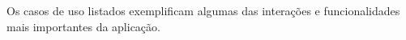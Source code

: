 Os casos de uso listados exemplificam algumas das interações e funcionalidades mais importantes da aplicação.

\begin{comment}
    \begin{table}[h]
        \centering
        \caption{Casos de Uso}
        \label{tab:tabela_casos_de_uso}
        \resizebox{\textwidth}{!}{%
        \rowcolors{1}{}{lightlightgray}
        \begin{tabular}{cccc}
        \hline
        \textbf{ID} & \textbf{Nome} & \textbf{Ator} & \textbf{Descrição} \\ \hline
        \textbf{UC01} & Efetuar login & \begin{tabular}[c]{@{}c@{}}Aluno, Coordenador\\ ou Professor\end{tabular} & \begin{tabular}[c]{@{}c@{}}Autenticação de usuários cadastrados no sistema,\\ permitindo a realização de operações restritas à cada perfil\end{tabular} \\
        \textbf{UC02} & Cadatrar usuário & Coordenador & \begin{tabular}[c]{@{}c@{}}Inclusão no sistema usuários para  executar as operações de acordo \\ com o perfil (Aluno ou Professor)\end{tabular} \\
        \textbf{UC03} & Visualizar disciplina & Aluno ou Professor & Visualização das informações da disciplina: Ano letivo, professor \\
        \textbf{UC04} & Avaliar disciplina & Aluno & Avaliação da disciplina cursada no ano letivo em questão \\
        \textbf{UC05} & Cadastrar disciplina & Coordenador & \begin{tabular}[c]{@{}c@{}}Cadastro de uma disciplina no sistema informando NOME, PERÍODO LETIVO, \\ TURNO e PROFESSOR\end{tabular} \\
        \textbf{UC06} & Cadastrar período & Professor & Cadastro de ano letivo no sistema (ANO) \\
        \textbf{UC07} & Visualizar relatório & Coordenador ou Professor & Visualização das avaliações feitas pelos alunos da disciplina
        \end{tabular}%
        }
    \end{table}
\end{comment}



